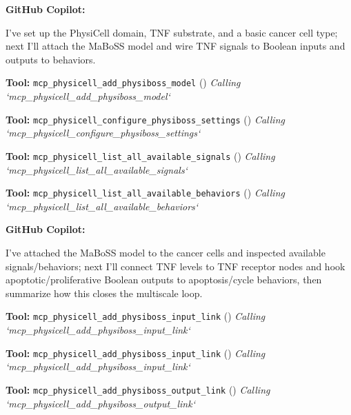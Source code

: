 \documentclass[11pt,a4paper]{article}
\begin{document}
\begin{copilotbox}
\textbf{GitHub Copilot:}

I’ve set up the PhysiCell domain, TNF substrate, and a basic cancer cell type; next I’ll attach the MaBoSS model and wire TNF signals to Boolean inputs and outputs to behaviors.

\end{copilotbox}
\begin{toolokbox}
\textbf{Tool:} \texttt{mcp\_physicell\_add\_physiboss\_model} (\checkmark)
\textit{Calling `mcp\_physicell\_add\_physiboss\_model`}
\end{toolokbox}
\begin{toolokbox}
\textbf{Tool:} \texttt{mcp\_physicell\_configure\_physiboss\_settings} (\checkmark)
\textit{Calling `mcp\_physicell\_configure\_physiboss\_settings`}
\end{toolokbox}
\begin{toolokbox}
\textbf{Tool:} \texttt{mcp\_physicell\_list\_all\_available\_signals} (\checkmark)
\textit{Calling `mcp\_physicell\_list\_all\_available\_signals`}
\end{toolokbox}
\begin{toolokbox}
\textbf{Tool:} \texttt{mcp\_physicell\_list\_all\_available\_behaviors} (\checkmark)
\textit{Calling `mcp\_physicell\_list\_all\_available\_behaviors`}
\end{toolokbox}
\begin{copilotbox}
\textbf{GitHub Copilot:}

I've attached the MaBoSS model to the cancer cells and inspected available signals/behaviors; next I'll connect TNF levels to TNF receptor nodes and hook apoptotic/proliferative Boolean outputs to apoptosis/cycle behaviors, then summarize how this closes the multiscale loop.

\end{copilotbox}
\begin{toolokbox}
\textbf{Tool:} \texttt{mcp\_physicell\_add\_physiboss\_input\_link} (\checkmark)
\textit{Calling `mcp\_physicell\_add\_physiboss\_input\_link`}
\end{toolokbox}
\begin{toolokbox}
\textbf{Tool:} \texttt{mcp\_physicell\_add\_physiboss\_input\_link} (\checkmark)
\textit{Calling `mcp\_physicell\_add\_physiboss\_input\_link`}
\end{toolokbox}
\begin{toolokbox}
\textbf{Tool:} \texttt{mcp\_physicell\_add\_physiboss\_output\_link} (\checkmark)
\textit{Calling `mcp\_physicell\_add\_physiboss\_output\_link`}
\end{toolokbox}
\end{document}
